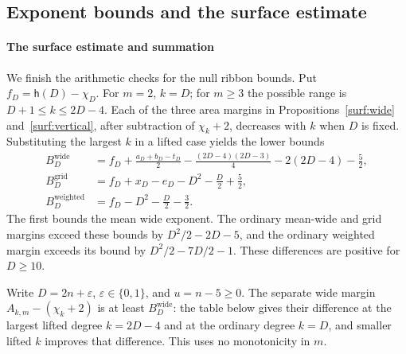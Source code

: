 \documentclass[11pt]{amsart}
\theoremstyle{definition}
\theoremstyle{remark}
\numberwithin{equation}{section}
\begin{document}
\subsection{Exponent bounds and the surface estimate}\label{surf:completion}

\paragraph{The surface estimate and summation}

We finish the arithmetic checks for the null ribbon bounds. Put $f_D=\mathsf{h}(D)-\chi_D$. For $m=2$, $k=D$; for $m\ge3$ the possible range is $D+1\le k\le2D-4$. Each of the three area margins in Propositions~\ref{surf:wide} and~\ref{surf:vertical}, after subtraction of $\chi_k+2$, decreases with $k$ when $D$ is fixed. Substituting the largest $k$ in a lifted case yields the lower bounds
\begin{align*}
B_D^{\mathrm{wide}}&=f_D+\frac{a_D+b_D-t_D}{2}-\frac{(2D-4)(2D-3)}4-2(2D-4)-\frac52,\\
B_D^{\mathrm{grid}}&=f_D+x_D-e_D-D^2-\frac D2+\frac52,\\
B_D^{\mathrm{weighted}}&=f_D-D^2-\frac D2-\frac32.
\end{align*}
The first bounds the mean wide exponent. The ordinary mean-wide and grid margins exceed these bounds by $D^2/2-2D-5$, and the ordinary weighted margin exceeds its bound by $D^2/2-7D/2-1$. These differences are positive for $D\ge10$.

Write $D=2n+\varepsilon$, $\varepsilon\in\{0,1\}$, and $u=n-5\ge0$. The separate wide margin $A_{k,m}-(\chi_k+2)$ is at least $B_D^{\mathrm{wide}}$: the table below gives their difference at the largest lifted degree $k=2D-4$ and at the ordinary degree $k=D$, and smaller lifted $k$ improves that difference. This uses no monotonicity in $m$.
\end{document}
